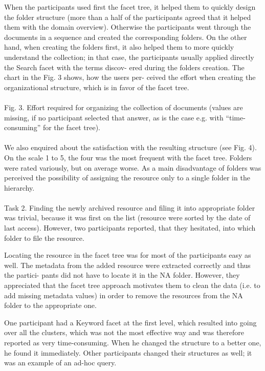 \documentclass{llncs}
\begin{document}
When the participants used first the facet tree, it helped them to quickly design the folder structure (more than a half of the participants agreed that it helped them with the domain overview). Otherwise the participants went through the documents in a sequence and created the corresponding folders. On the other hand, when creating the folders first, it also helped them to more quickly understand the collection; in that case, the participants usually applied directly the Search facet with the terms discov- ered during the folders creation. The chart in the Fig. 3 shows, how the users per- ceived the effort when creating the organizational structure, which is in favor of the facet tree. \\ \\
Fig. 3. Effort required for organizing the collection of documents (values are missing, if no participant selected that answer, as is the case e.g. with “time-consuming” for the facet tree).
\\ \\
We also enquired about the satisfaction with the resulting structure (see Fig. 4). On the scale 1 to 5, the four was the most frequent with the facet tree. Folders were rated variously, but on average worse. As a main disadvantage of folders was perceived the possibility of assigning the resource only to a single folder in the hierarchy.
\\ \\
Task 2. Finding the newly archived resource and filing it into appropriate folder was trivial, because it was first on the list (resource were sorted by the date of last access). However, two participants reported, that they hesitated, into which folder to file the resource.

Locating the resource in the facet tree was for most of the participants easy as well. The metadata from the added resource were extracted correctly and thus the partici- pants did not have to locate it in the NA folder. However, they appreciated that the facet tree approach motivates them to clean the data (i.e. to add missing metadata values) in order to remove the resources from the NA folder to the appropriate one.

One participant had a Keyword facet at the first level, which resulted into going over all the clusters, which was not the most effective way and was therefore reported as very time-consuming. When he changed the structure to a better one, he found it immediately. Other participants changed their structures as well; it was an example of an ad-hoc query.
\end{document}

